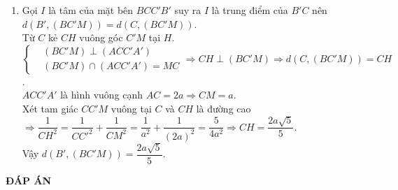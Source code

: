\begin{bt}
{\begin{enumerate}
			Mặt khác $BM \subset (BC'M)\Rightarrow (BC'M)\perp (ACC'A')$.
			\item Gọi $I$ là tâm của mặt bên $BCC'B'$ suy ra $I$ là trung điểm của $B'C$ nên $d(B',(BC'M))=d(C,(BC'M))$.\\
			Từ $C$ kẻ $CH$ vuông góc $C'M$ tại $H$.\\
			$\left\{\begin{aligned}&(BC'M) \perp (ACC'A')\\&(BC'M) \cap (ACC'A')= MC\end{aligned}\right. \Rightarrow CH \perp (BC'M)\Rightarrow d(C,(BC'M)) = CH$.\\
			$ACC'A'$ là hình vuông cạnh $AC=2a\Rightarrow CM=a$.\\
			Xét tam giác $CC'M$ vuông tại $C$ và $CH$ là đường cao\\
			$\Rightarrow \dfrac {1}{CH^2}=\dfrac {1}{CC'^2}+\dfrac {1}{CM^2}=\dfrac {1}{a^2}+\dfrac {1}{(2a)^2}=\dfrac {5}{4a^2}\Rightarrow CH=\dfrac{2a \sqrt{5}}{5}$.\\
			Vậy $d(B',(BC'M))=\dfrac{2a \sqrt{5}}{5}$.			
		\end{enumerate}
	}
\end{bt}

\newpage
\begin{center}
	\textbf{ĐÁP ÁN}
\end{center}
\begin{multicols}{10}
	
\end{multicols}
